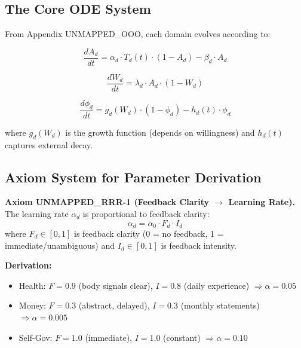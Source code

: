 \subsection{The Core ODE System}

From Appendix UNMAPPED_OOO, each domain evolves according to:

\begin{equation}
\frac{dA_d}{dt} = \alpha_d \cdot T_d(t) \cdot (1 - A_d) - \beta_d \cdot A_d
\label{eq:rrr-awareness}
\end{equation}

\begin{equation}
\frac{dW_d}{dt} = \lambda_d \cdot A_d \cdot (1 - W_d)
\label{eq:rrr-willingness}
\end{equation}

\begin{equation}
\frac{d\phi_d}{dt} = g_d(W_d) \cdot (1 - \phi_d) - h_d(t) \cdot \phi_d
\label{eq:rrr-phase}
\end{equation}

where $g_d(W_d)$ is the growth function (depends on willingness) and $h_d(t)$ captures external decay.

\subsection{Axiom System for Parameter Derivation}

\begin{tcolorbox}[colback=red!5!white, colframe=red!75!black, title=Axiom UNMAPPED_RRR-1: Feedback Clarity]
\textbf{Axiom UNMAPPED_RRR-1 (Feedback Clarity $\rightarrow$ Learning Rate).}
The learning rate $\alpha_d$ is proportional to feedback clarity:
\begin{equation}
\alpha_d = \alpha_0 \cdot F_d \cdot I_d
\end{equation}
where $F_d \in [0,1]$ is feedback clarity (0 = no feedback, 1 = immediate/unambiguous)
and $I_d \in [0,1]$ is feedback intensity.

\textbf{Derivation:}
\begin{itemize}[nosep]
\item Health: $F = 0.9$ (body signals clear), $I = 0.8$ (daily experience) $\Rightarrow \alpha = 0.05$
\item Money: $F = 0.3$ (abstract, delayed), $I = 0.3$ (monthly statements) $\Rightarrow \alpha = 0.005$
\item Self-Gov: $F = 1.0$ (immediate), $I = 1.0$ (constant) $\Rightarrow \alpha = 0.10$
\end{itemize}
\end{tcolorbox}

